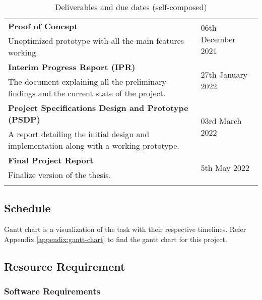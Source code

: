 \begin{longtable}{|p{115mm}|p{35mm}|}
    \textbf{Proof of Concept} & 
    \multirow{2}{*}{06th December 2021} \\
    Unoptimized prototype with all the main features working. & 
     \\ \hline

    \textbf{Interim Progress Report (IPR)} & 
    \multirow{2}{*}{27th January 2022} \\
    The document explaining all the preliminary findings and the current state of the project. & 
     \\ \hline

    \textbf{Project Specifications Design and Prototype (PSDP)} & 
    \multirow{2}{*}{03rd March 2022} \\ 
    A report detailing the initial design and implementation along with a working prototype. & 
     \\ \hline



    \textbf{Final Project Report} & 
    \multirow{2}{*}{5th May 2022} \\
    Finalize version of the thesis. & 
     \\ \hline

\caption{Deliverables and due dates (self-composed)}
\end{longtable}

\subsection{Schedule}
Gantt chart is a visualization of the task with their respective timelines. Refer Appendix \ref{appendix:gantt-chart} to find the gantt chart for this project.



\subsection{Resource Requirement}

\subsubsection{Software Requirements}

